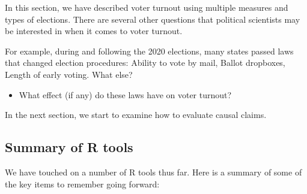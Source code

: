 \documentclass[
  letterpaper,
  DIV=11,
  numbers=noendperiod]{scrreprt}
\providecommand{\tightlist}{%
  \setlength{\itemsep}{0pt}\setlength{\parskip}{0pt}}\usepackage{longtable,booktabs,array}
\begin{document}
In this section, we have described voter turnout using multiple measures
and types of elections. There are several other questions that political
scientists may be interested in when it comes to voter turnout.

For example, during and following the 2020 elections, many states passed
laws that changed election procedures: Ability to vote by mail, Ballot
dropboxes, Length of early voting. What else?

\begin{itemize}
\tightlist
\item
  What effect (if any) do these laws have on voter turnout?
\end{itemize}

In the next section, we start to examine how to evaluate causal claims.

\hypertarget{summary-of-r-tools}{%
\subsection{Summary of R tools}\label{summary-of-r-tools}}

We have touched on a number of R tools thus far. Here is a summary of
some of the key items to remember going forward:
\end{document}
